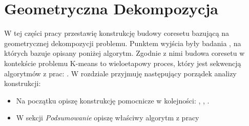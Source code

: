 \chapter{Geometryczna Dekompozycja}\label{geo}

W tej części pracy przestawię konstrukcję budowy coresetu bazującą na geometrycznej dekompozycji problemu.
Punktem wyjścia były badania \cite{DBLP:journals/ki/MunteanuS18}, na których bazuje opisany poniżej algorytm.
Zgodnie z nimi budowa coresetu w kontekście problemu K-means to wieloetapowy proces, który jest sekwencją algorytmów z prac: \cite{Gonzalez1985ClusteringTM} \cite{10.1145/1007352.1007400} \cite{Arya2004LocalSH} \cite{DBLP:journals/ki/MunteanuS18}.
W rozdziale przyjmuję następujący porządek analizy konstrukcji:
\begin{itemize}
    \item Na początku opiszę konstrukcję pomocnicze w kolejności: \cite{Gonzalez1985ClusteringTM}, \cite{10.1145/1007352.1007400}, \cite{Arya2004LocalSH}.
    \item W sekcji \textit{Podsumowanie} opiszę właściwy algorytm z pracy \cite{DBLP:journals/ki/MunteanuS18}
\end{itemize}





